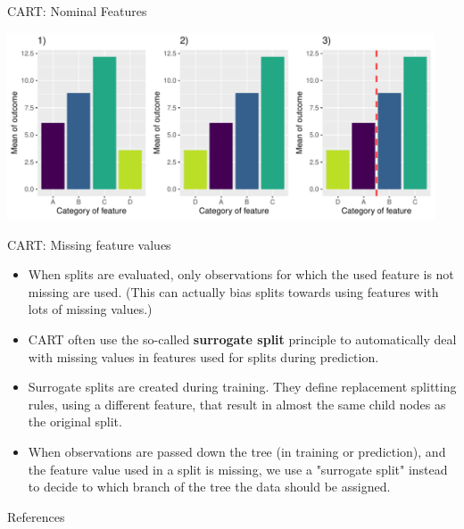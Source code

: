 \begin{vbframe}{CART: Nominal Features}
\begin{knitrout}
{\centering \includegraphics[width=0.95\textwidth]{figure/cart_splitcomp_4} 

}



\end{knitrout}
\end{vbframe}

\begin{vbframe}{CART: Missing feature values}
  \begin{itemize}
    \item When splits are evaluated, only observations for which the used feature is not missing are used. (This can actually bias splits towards using features with lots of missing values.) 
  \item CART often use the so-called \textbf{surrogate split} principle to automatically deal with missing values in features used for splits during prediction.
  \item Surrogate splits are created during training. They define replacement splitting rules, using a different feature, that result in almost the same child nodes as the original split.
   \item When observations are passed down the tree (in training or prediction), and the feature value used in a split is missing, we use a "surrogate split" instead to decide to which branch of the tree the data should be assigned.
  \end{itemize}
\end{vbframe}

\begin{vbframe}{References}
\footnotesize
\nocite{*}


\end{vbframe}


\endlecture

